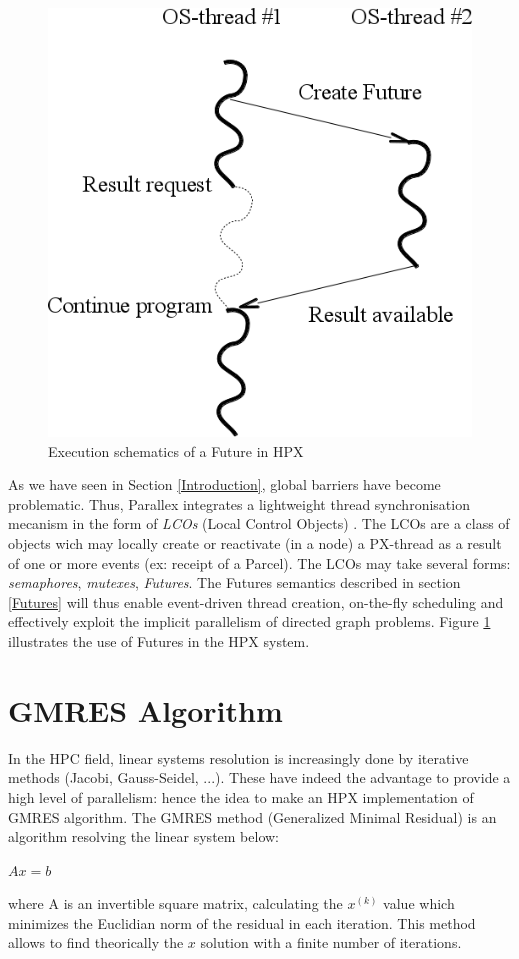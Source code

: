 \documentclass{llncs}
\begin{document}
\begin{figure}[h]
\begin{center}
\includegraphics[scale=0.4]{Images/Im5.png}
\end{center}
\caption{Execution schematics of a Future in HPX}
\label{hpxthread}
\end{figure}

As we have seen in Section \ref{Introduction}, global barriers have become problematic. Thus, Parallex integrates a lightweight thread synchronisation mecanism in the form of \emph{LCOs} (Local Control Objects) \cite{Parallex}. The LCOs are a class of objects wich may locally create or reactivate (in a node) a PX-thread as a result of one or more events (ex: receipt of a Parcel). The LCOs may take several forms: \emph{semaphores}, \emph{mutexes}, \emph{Futures}. The Futures semantics described in section \ref{Futures} will thus enable event-driven thread creation, on-the-fly scheduling and effectively exploit the implicit parallelism of directed graph problems. Figure \ref{hpxthread} illustrates the use of Futures in the HPX system.

\section{GMRES Algorithm}\label{GMRES}
In the HPC field, linear systems resolution is increasingly done by iterative methods \cite{Methodes} (Jacobi, Gauss-Seidel, ...). These have indeed the advantage to provide a high level of parallelism: hence the idea to make an HPX implementation of GMRES algorithm. The GMRES method (Generalized Minimal Residual) \cite{GMRES} is an algorithm resolving the linear system below:
\begin{center}
  $Ax=b$
\end{center}
where A is an invertible square matrix, calculating the $x^{(k)}$ value which minimizes the Euclidian norm of the residual in each iteration. This method allows to find theorically the $x$ solution with a finite number of iterations.
\end{document}
